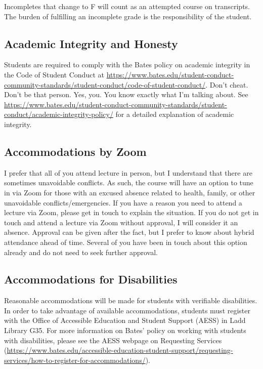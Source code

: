 \documentclass[11pt]{article}
\begin{document}
\footnotesize{Incompletes that change to F will count as an attempted course on transcripts. The burden of fulfilling an incomplete grade is the responsibility of the student.}

\subsection*{Academic Integrity and Honesty}
\footnotesize{Students are required to comply with the Bates policy on academic integrity in the Code of Student Conduct at \url{https://www.bates.edu/student-conduct-community-standards/student-conduct/code-of-student-conduct/}. Don't cheat. Don't be that person. Yes, you. You know exactly what I'm talking about. See \url{https://www.bates.edu/student-conduct-community-standards/student-conduct/academic-integrity-policy/} for a detailed explanation of academic integrity.}

\subsection*{Accommodations by Zoom}
\footnotesize{I prefer that all of you attend lecture in person, but I understand that there are sometimes unavoidable conflicts. As such, the course will have an option to tune in via Zoom for those with an excused absence related to health, family, or other unavoidable conflicts/emergencies. If you have a reason you need to attend a lecture via Zoom, please get in touch to explain the situation. If you do not get in touch and attend a lecture via Zoom without approval, I will consider it an absence. Approval can be given after the fact, but I prefer to know about hybrid attendance ahead of time. Several of you have been in touch about this option already and do not need to seek further approval.}

\subsection*{Accommodations for Disabilities}
\footnotesize{Reasonable accommodations will be made for students with verifiable disabilities. In order to take advantage of available accommodations, students must register with the Office of Accessible Education and Student Support (AESS) in Ladd Library G35. For more information on Bates' policy on working with students with disabilities, please see the AESS webpage on Requesting Services (\url{https://www.bates.edu/accessible-education-student-support/requesting-services/how-to-register-for-accommodations/}).}
\end{document}
